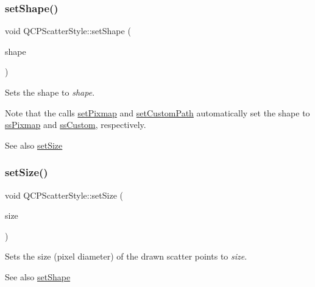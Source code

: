 \subsubsection{\texorpdfstring{set\+Shape()}{setShape()}}
{\footnotesize\ttfamily void Q\+C\+P\+Scatter\+Style\+::set\+Shape (\begin{DoxyParamCaption}\item[{\mbox{\hyperlink{class_q_c_p_scatter_style_adb31525af6b680e6f1b7472e43859349}{Q\+C\+P\+Scatter\+Style\+::\+Scatter\+Shape}}}]{shape }\end{DoxyParamCaption})}

Sets the shape to {\itshape shape}.

Note that the calls \mbox{\hyperlink{class_q_c_p_scatter_style_a5fb611d46acfac520d7b89a1c71d9246}{set\+Pixmap}} and \mbox{\hyperlink{class_q_c_p_scatter_style_a96a3e949f90b2afe5677ca9412a12a1e}{set\+Custom\+Path}} automatically set the shape to \mbox{\hyperlink{class_q_c_p_scatter_style_adb31525af6b680e6f1b7472e43859349a8718b849ca7c307b07b8e091efb0c31e}{ss\+Pixmap}} and \mbox{\hyperlink{class_q_c_p_scatter_style_adb31525af6b680e6f1b7472e43859349a15d9bcfd9de94edda949006529f9219d}{ss\+Custom}}, respectively.

\begin{DoxySeeAlso}{See also}
\mbox{\hyperlink{class_q_c_p_scatter_style_aaefdd031052892c4136129db68596e0f}{set\+Size}} 
\end{DoxySeeAlso}
\mbox{\label{class_q_c_p_scatter_style_aaefdd031052892c4136129db68596e0f}} 
\subsubsection{\texorpdfstring{set\+Size()}{setSize()}}
{\footnotesize\ttfamily void Q\+C\+P\+Scatter\+Style\+::set\+Size (\begin{DoxyParamCaption}\item[{double}]{size }\end{DoxyParamCaption})}

Sets the size (pixel diameter) of the drawn scatter points to {\itshape size}.

\begin{DoxySeeAlso}{See also}
\mbox{\hyperlink{class_q_c_p_scatter_style_a7c641c4d4c6d29cb705d3887cfce91c1}{set\+Shape}} 
\end{DoxySeeAlso}
\mbox{\label{class_q_c_p_scatter_style_acabc2a8c83d650b946f50c3166b6c35e}} 
